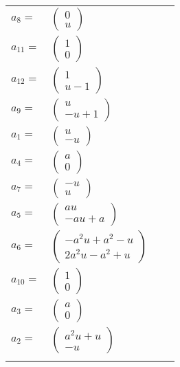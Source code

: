 \documentclass[1p]{elsarticle_modified}
\theoremstyle{definition}
\begin{document}
\begin{tabular}{m{7pt} m{180pt} m{7pt} m{180pt} }
\flushright $a_{8}=$&$\begin{pmatrix}0\\u\end{pmatrix}$ \\
\flushright $a_{11}=$&$\begin{pmatrix}1\\0\end{pmatrix}$ \\
\flushright $a_{12}=$&$\begin{pmatrix}1\\u-1\end{pmatrix}$ \\
\flushright $a_{9}=$&$\begin{pmatrix}u\\- u+1\end{pmatrix}$ \\
\flushright $a_{1}=$&$\begin{pmatrix}u\\- u\end{pmatrix}$ \\
\flushright $a_{4}=$&$\begin{pmatrix}a\\0\end{pmatrix}$ \\
\flushright $a_{7}=$&$\begin{pmatrix}- u\\u\end{pmatrix}$ \\
\flushright $a_{5}=$&$\begin{pmatrix}a u\\- a u+a\end{pmatrix}$ \\
\flushright $a_{6}=$&$\begin{pmatrix}- a^2 u+a^2- u\\2 a^2 u- a^2+u\end{pmatrix}$ \\
\flushright $a_{10}=$&$\begin{pmatrix}1\\0\end{pmatrix}$ \\
\flushright $a_{3}=$&$\begin{pmatrix}a\\0\end{pmatrix}$ \\
\flushright $a_{2}=$&$\begin{pmatrix}a^2 u+u\\- u\end{pmatrix}$\\&\end{tabular}
\end{document}
